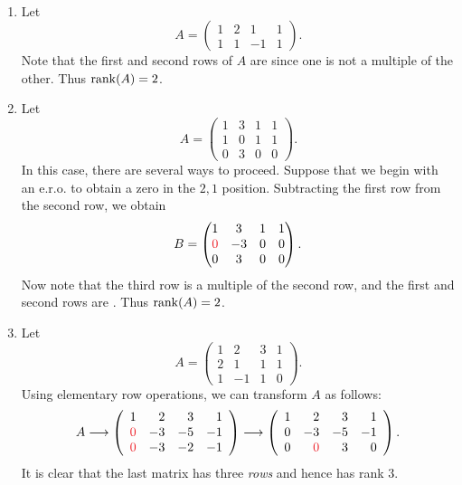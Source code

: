 \begin{example} \label{example 3.2.4} \ 

\begin{enumerate}
\item Let
\[
    A = \begin{pmatrix} 1 & 2 & 1 & 1 \\ 1 & 1 & -1 & 1 \end{pmatrix}.
\]
Note that the first and second rows of \(A\) are \LID{} since one is not a multiple of the other.
Thus \(\mathrm{rank}(A) = 2\).

\item Let
\[
    A = \begin{pmatrix} 1 & 3 & 1 & 1 \\ 1 & 0 & 1 & 1 \\ 0 & 3 & 0 & 0 \end{pmatrix}.
\]
In this case, there are several ways to proceed.
Suppose that we begin with an e.r.o. to obtain a zero in the \(2,1\) position.
Subtracting the first row from the second row, we obtain
\[
    B = \begin{pmatrix} 1 & 3 & 1 & 1 \\ \RED{0} & -3 & 0 & 0 \\ 0 & 3 & 0 & 0 \end{pmatrix}.
\]
Now note that the third row is a multiple of the second row, and the first and second rows are \LID{}. Thus \(\mathrm{rank}(A) = 2\).
\item Let
\[
    A = \begin{pmatrix} 1 & 2 & 3 & 1 \\ 2 & 1 & 1 & 1 \\ 1 & -1 & 1 & 0 \end{pmatrix}.
\]
Using elementary row operations, we can transform \(A\) as follows:
\[
    A \longrightarrow
    \left(\begin{array}{rrrr}
        1 & 2 & 3 & 1 \\
        \RED{0} & -3 & -5 & -1 \\
        \RED{0} & -3 & -2 & -1
    \end{array}\right)
    \longrightarrow
    \left(\begin{array}{rrrr}
        1 & 2 & 3 & 1 \\
        0 & -3 & -5 & -1 \\
        0 & \RED{0} & 3 & 0
    \end{array}\right).
\]
It is clear that the last matrix has three \LID{} \emph{rows} and hence has rank \(3\). 
\end{enumerate}
\end{example}

